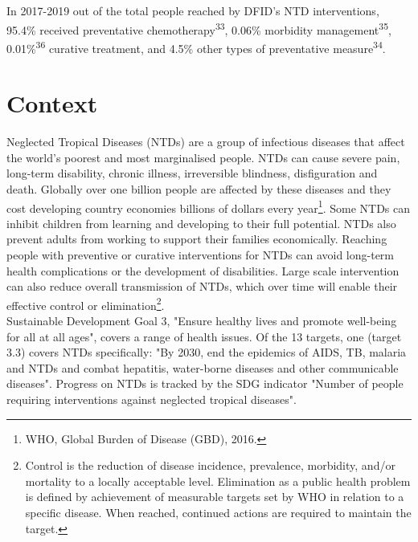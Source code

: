 In 2017-2019 out of the total people reached by DFID's NTD interventions, 95.4\% received preventative chemotherapy\textsuperscript{33}, 0.06\% morbidity management\textsuperscript{35}, 0.01\%\textsuperscript{36} curative treatment, and 4.5\% other types of preventative measure\textsuperscript{34}. %



\section{Context}

Neglected Tropical Diseases (NTDs) are a group of infectious diseases that affect the world's poorest and most marginalised people. %
NTDs can cause severe pain, long-term disability, chronic illness, irreversible blindness, disfiguration and death. %
Globally over one billion people are affected by these diseases and they cost developing country economies billions of dollars every year\footnote{WHO, Global Burden of Disease (GBD), 2016.}. %
Some NTDs can inhibit children from learning and developing to their full potential.  NTDs also prevent adults from working to support their families economically. %
Reaching people with preventive or curative interventions for NTDs can avoid long-term health complications or the development of disabilities. %
Large scale intervention can also reduce overall transmission of NTDs, which over time will enable their effective control or elimination\footnote{Control is the reduction of disease incidence, prevalence, morbidity, and/or mortality to a locally acceptable level. Elimination as a public health problem is defined by achievement of measurable targets set by WHO in relation to a specific disease. When reached, continued actions are required to maintain the target.}. \\%

Sustainable Development Goal 3, "Ensure healthy lives and promote well-being for all at all ages", covers a range of health issues. %
Of the 13 targets, one (target 3.3) covers NTDs specifically: "By 2030, end the epidemics of AIDS, TB, malaria and NTDs and combat hepatitis, water-borne diseases and other communicable diseases". %
Progress on NTDs is tracked by the SDG indicator "Number of people requiring interventions against neglected tropical diseases". \\%


